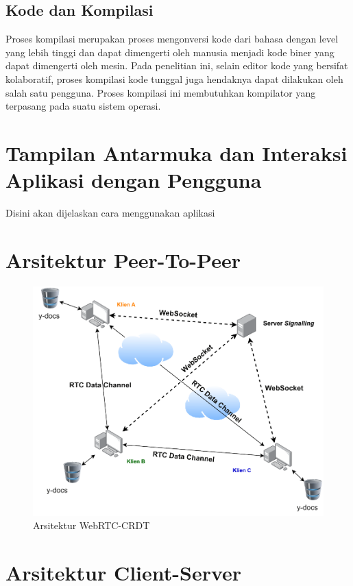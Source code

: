\subsection{Kode dan Kompilasi}

Proses kompilasi merupakan proses mengonversi kode dari bahasa dengan level yang lebih tinggi dan dapat dimengerti oleh manusia menjadi kode biner yang dapat dimengerti oleh mesin. Pada penelitian ini, selain editor kode yang bersifat kolaboratif, proses kompilasi kode tunggal juga hendaknya dapat dilakukan oleh salah satu pengguna. Proses kompilasi ini membutuhkan kompilator yang terpasang pada suatu sistem operasi.

\section{Tampilan Antarmuka dan Interaksi Aplikasi dengan Pengguna}

Disini akan dijelaskan cara menggunakan aplikasi

\section{Arsitektur Peer-To-Peer}

\begin{figure}
    \centering
    \includegraphics[scale=0.6]{assets/skripsi/Arsitektur-WebRTC-CRDT}
    \caption{Arsitektur WebRTC-CRDT}
\end{figure}

\section{Arsitektur Client-Server}

